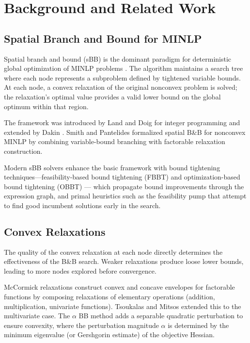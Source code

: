 \documentclass[12pt,preprint]{article}
\begin{document}
\section{Background and Related Work}
\label{org-background-and-related-work}
\subsection{Spatial Branch and Bound for MINLP}
\label{org-spatial-branch-and-bound-for-minlp}
Spatial branch and bound (sBB) is the dominant paradigm for deterministic global optimization of MINLP problems \cite{Belotti2013}. The algorithm maintains a search tree where each node represents a subproblem defined by tightened variable bounds. At each node, a convex relaxation of the original nonconvex problem is solved; the relaxation's optimal value provides a valid lower bound on the global optimum within that region.


The framework was introduced by Land and Doig \cite{Land1960} for integer programming and extended by Dakin \cite{Dakin1965}. Smith and Pantelides \cite{Smith1999} formalized spatial B\&B for nonconvex MINLP by combining variable-bound branching with factorable relaxation construction.


Modern sBB solvers enhance the basic framework with bound tightening techniques---feasibility-based bound tightening (FBBT) and optimization-based bound tightening (OBBT) \cite{Belotti2009,Gleixner2017} --- which propagate bound improvements through the expression graph, and primal heuristics such as the feasibility pump \cite{Fischetti2005} that attempt to find good incumbent solutions early in the search.

\subsection{Convex Relaxations}
\label{org-convex-relaxations}
The quality of the convex relaxation at each node directly determines the effectiveness of the B\&B search. Weaker relaxations produce loose lower bounds, leading to more nodes explored before convergence.


McCormick relaxations \cite{McCormick1976} construct convex and concave envelopes for factorable functions by composing relaxations of elementary operations (addition, multiplication, univariate functions). Tsoukalas and Mitsos \cite{Tsoukalas2014} extended this to the multivariate case. The $\alpha$ BB method \cite{Androulakis1995,Adjiman1998} adds a separable quadratic perturbation to ensure convexity, where the perturbation magnitude $\alpha$ is determined by the minimum eigenvalue (or Gershgorin estimate) of the objective Hessian.
\end{document}
